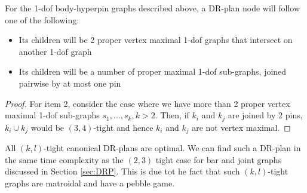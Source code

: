 \begin{observation}
    For the 1-dof body-hyperpin graphs described above, a DR-plan node will follow one of the following:

    \begin{itemize}
        \item Its children will be 2 proper vertex maximal 1-dof graphs that intersect on another 1-dof graph
        \item Its children will be a number of proper maximal 1-dof sub-graphs, joined pairwise by at most one pin
    \end{itemize}
\end{observation}

\begin{proof}

    For item 2, consider the case where we have more than 2 proper vertex maximal 1-dof sub-graphs $s_1, ..., s_k, k > 2$. Then, if $k_i$ and $k_j$ are joined by $2$ pins, $k_i \cup k_j$ would be $(3,4)$-tight and hence $k_i$ and $k_j$ are not vertex maximal.
\end{proof}

\begin{remark}
\label{rem:1dofcanon}

    All $(k,l)$-tight canonical DR-plans are optimal. We can find such a DR-plan in the same time complexity as the $(2,3)$ tight case for bar and joint graphs discussed in Section \ref{sec:DRP}. This is due tot he fact that such $(k,l)$-tight graphs are matroidal and have a pebble game.
\end{remark}


